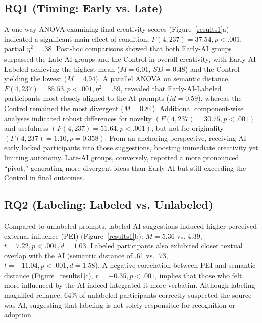 \documentclass{article}
\begin{document}
\subsection{RQ1 (Timing: Early vs. Late)} 
A one-way ANOVA examining final creativity scores (Figure~\ref{results1}a) indicated a significant main effect of condition, \(F(4, 237) = 37.54, p < .001\), partial \(\eta^2 = .38\). Post-hoc comparisons showed that both Early-AI groups surpassed the Late-AI groups and the Control in overall creativity, with Early-AI-Labeled achieving the highest mean (\(M = 6.01\), \(SD = 0.48\)) and the Control yielding the lowest (\(M = 4.94\)). A parallel ANOVA on semantic distance, \(F(4, 237) = 85.53, p < .001, \eta^2 = .59\), revealed that Early-AI-Labeled participants most closely aligned to the AI prompts (\(M = 0.59\)), whereas the Control remained the most divergent (\(M = 0.84\)). Additional component-wise analyses indicated robust differences for novelty \((F(4, 237)=30.75, p<.001)\) and usefulness \((F(4, 237)=51.64, p<.001)\), but not for originality \((F(4,237)=1.10, p=0.358)\). From an anchoring perspective, receiving AI early locked participants into those suggestions, boosting immediate creativity yet limiting autonomy. Late-AI groups, conversely, reported a more pronounced “pivot,” generating more divergent ideas than Early-AI but still exceeding the Control in final outcomes.

\subsection{RQ2 (Labeling: Labeled vs. Unlabeled)}
Compared to unlabeled prompts, labeled AI suggestions induced higher perceived external influence (PEI) (Figure~\ref{results1}b): \(M = 5.36\) vs. 4.39, \(t = 7.22, p < .001, d = 1.03\). Labeled participants also exhibited closer textual overlap with the AI (semantic distance of .61 vs. .73, \(t = -11.04, p < .001, d = 1.58\)). A negative correlation between PEI and semantic distance (Figure~\ref{results1}c), \(r = -0.35, p < .001\), implies that those who felt more influenced by the AI indeed integrated it more verbatim. Although labeling magnified reliance, 64\% of unlabeled participants correctly suspected the source was AI, suggesting that labeling is not solely responsible for recognition or adoption.
\end{document}
